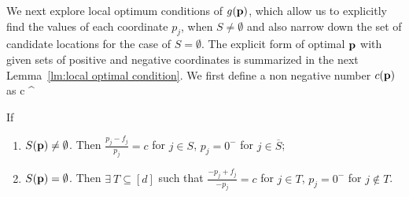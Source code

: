 We next explore local optimum conditions of $g(\mathbf{p})$, which allow us to explicitly find the values of each coordinate $p_j$, when $S\ne\emptyset$ and also narrow down the set of candidate locations for the case of $S=\emptyset$. The explicit form of optimal $\mathbf{p}$ with given sets of positive and negative coordinates is summarized in the next Lemma~\ref{lm:local optimal condition}. We first define a non negative number $c(\mathbf{p})$ as  
    \be
    \label{eq:constant_c}
    c\eqdef
    \lambda^\cdot\frac{\qnorm{\loc-\facility}}{\qnorm{\loc}} 
    \ee  
\begin{lemma}
    \label{lm:local optimal condition}
    If
     \begin{enumerate}[label=(\roman*)]
        \item $S(\mathbf{p})\ne\emptyset$. Then $\frac{p_j-f_j}{p_j} = c$ for $j\in S$,  $p_j=0^-$ for $j\in \overline{S}$;
        \item$S(\mathbf{p})=\emptyset$. Then $\exists\ T\subseteq [d]$ such that $\frac{-p_j+f_j}{-p_j}=c$ for $j\in T$, $p_j=0^-$ for $j\notin T$.
    \end{enumerate}
\end{lemma}
